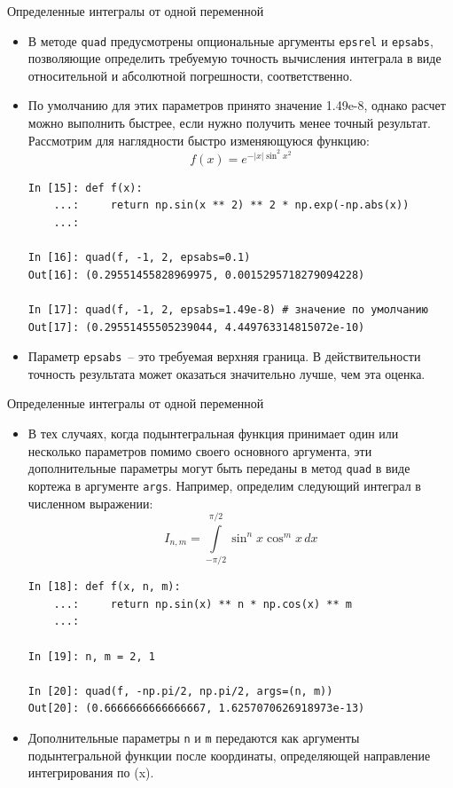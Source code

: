 \documentclass[aspectratio=169, mathserif]{beamer}	%
\begin{document}
\begin{frame}[fragile]{Определенные интегралы от одной переменной}
\scriptsize
\begin{itemize}
	\item В методе \texttt{quad} предусмотрены опциональные аргументы \texttt{epsrel} и \texttt{epsabs}, позволяющие определить требуемую точность вычисления интеграла в виде относительной и абсолютной погрешности, соответственно.  
	\item По умолчанию для этих параметров принято значение 1.49e-8, однако расчет можно выполнить быстрее, если нужно получить менее точный результат. 
	Рассмотрим для наглядности быстро изменяющуюся функцию: 
	$$f(x) = e^{-|x|\sin^2x^2}$$

\begin{lstlisting}[language=iPython, numbers=none, frame=none, ]
In [15]: def f(x):
    ...:     return np.sin(x ** 2) ** 2 * np.exp(-np.abs(x))
    ...:

In [16]: quad(f, -1, 2, epsabs=0.1)
Out[16]: (0.29551455828969975, 0.0015295718279094228)

In [17]: quad(f, -1, 2, epsabs=1.49e-8) # значение по умолчанию
Out[17]: (0.29551455505239044, 4.449763314815072e-10)
\end{lstlisting}

	\item Параметр \texttt{epsabs}~-- это требуемая верхняя граница. В действительности точность результата может оказаться значительно лучше, чем эта оценка.
\end{itemize}
\vfil
\end{frame}

\begin{frame}[fragile]{Определенные интегралы от одной переменной}
\scriptsize
\begin{itemize}
	\item В тех случаях, когда подынтегральная функция принимает один или несколько параметров помимо своего основного аргумента, эти дополнительные параметры могут быть переданы в метод \texttt{quad} в виде кортежа в аргументе \texttt{args}. 
	Например, определим следующий интеграл в численном выражении: 
	$$ I_{n,m} = \int\limits_{-\pi/2}^{\pi/2}\sin^nx\cos^mx\, dx $$
	
\begin{lstlisting}[language=iPython, numbers=none, frame=none, ]
In [18]: def f(x, n, m):
    ...:     return np.sin(x) ** n * np.cos(x) ** m
    ...:

In [19]: n, m = 2, 1

In [20]: quad(f, -np.pi/2, np.pi/2, args=(n, m))
Out[20]: (0.6666666666666667, 1.6257070626918973e-13)
\end{lstlisting}
	
	\item Дополнительные параметры \texttt{n} и \texttt{m} передаются как аргументы подынтегральной функции после координаты, определяющей направление интегрирования по (x).
\end{itemize}
\vfil
\end{frame}
\end{document}
